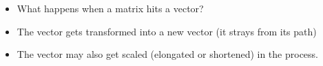 \documentclass[10pt, aspectratio=169]{beamer}
\begin{document}
\begin{frame}
  \begin{columns}

    \begin{column}{0.5\textwidth}
      \centering
    \end{column}

    \begin{column}{0.5\textwidth}
      \begin{itemize}
        \item<1-> What happens when a matrix hits a vector?
        
        \item<3-> The vector gets transformed into a new vector (it strays from its path)
        
        \item<3-> The vector may also get scaled (elongated or shortened) in the process.
      \end{itemize}
    \end{column}

  \end{columns}
\end{frame}
\end{document}
